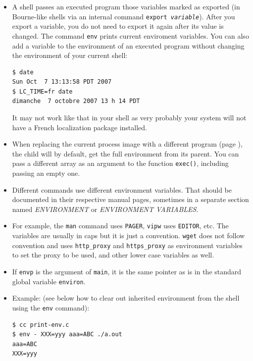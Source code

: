 \begin{itemize}
\item A shell passes an executed program those variables marked as exported
(in Bourne-like shells via an internal command \texttt{export \emph{variable}}).
After you export a variable, you do not need to export it again after its value
is changed.  The command \texttt{env} prints current enviroment variables.
You can also add a variable to the environment of an executed program without
changing the environment of your current shell:

\begin{verbatim}
$ date
Sun Oct  7 13:13:58 PDT 2007
$ LC_TIME=fr date
dimanche  7 octobre 2007 13 h 14 PDT
\end{verbatim}

It may not work like that in your shell as very probably your system will not
have a French localization package installed.
\item When replacing the current process image with a different program (page
\pageref{EXEC}), the child will by default, get the full environment from its
parent.  You can pass a different array as an argument to the function
\texttt{exec()}, including passing an empty one.
\item Different commands use different environment variables.  That should be
documented in their respective manual pages, sometimes in a separate section
named \emph{ENVIRONMENT} or \emph{ENVIRONMENT VARIABLES}.
\item For example, the \texttt{man} command uses \texttt{PAGER}, \texttt{vipw}
uses \texttt{EDITOR}, etc.  The variables are usually in caps but it is just a
convention.  \texttt{wget} does not follow convention and uses
\texttt{http\_proxy} and \texttt{https\_proxy} as environment variables to set
the proxy to be used, and other lower case variables as well.
\item If \texttt{envp} is the  argument of \texttt{main}, it is the same
pointer as is in the standard global variable \texttt{environ}.
\item Example:  (see below how to clear out inherited
environment from the shell using the \texttt{env} command):

\begin{verbatim}
$ cc print-env.c
$ env - XXX=yyy aaa=ABC ./a.out
aaa=ABC
XXX=yyy
\end{verbatim}
\end{itemize}



